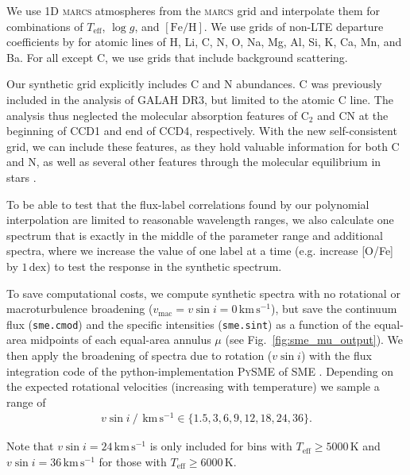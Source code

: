 \documentclass[
  journal=pasa,
  manuscript=research-paper, %
  year=2024,
  volume=37
]{cup-journal}
\newcommand{\Teff}{$T_\mathrm{eff}$\xspace}
\newcommand{\logg}{$\log g$\xspace}
\newcommand{\feh}{$\mathrm{[Fe/H]}$\xspace}
\newcommand{\vsini}{$v \sin i$\xspace}
\newcommand{\marcs}{\textsc{marcs}\xspace}
\newcommand{\dex}{\,\mathrm{dex}}	%
\newcommand{\kms}{\,\mathrm{km\,s^{-1}}}	%
\begin{document}
We use 1D \marcs atmospheres from the \marcs grid \citep[][version 2014]{Gustafsson2008} and interpolate them for combinations of \Teff, \logg, and \feh. We use grids of non-LTE departure coefficients by \citet{Amarsi2020} for atomic lines of H, Li, C, N, O, Na, Mg, Al, Si, K, Ca, Mn, and Ba. For all except C, we use grids that include background scattering.

Our synthetic grid explicitly includes C and N abundances. C was previously included in the analysis of GALAH DR3, but limited to the atomic C line. The analysis thus neglected the molecular absorption features of $\mathrm{C_2}$ and CN at the beginning of CCD1 and end of CCD4, respectively. With the new self-consistent grid, we can include these features, as they hold valuable information for both C and N, as well as several other features through the molecular equilibrium in stars \citep[see e.g.][]{Ting2018}.

To be able to test that the flux-label correlations found by our polynomial interpolation are limited to reasonable wavelength ranges, we also calculate one spectrum that is exactly in the middle of the parameter range and additional spectra, where we increase the value of one label at a time (e.g. increase [O/Fe] by $1\dex$) to test the response in the synthetic spectrum.

To save computational costs, we compute synthetic spectra with no rotational or macroturbulence broadening ($v_\text{mac} = v\sin i = 0\kms$), but save the continuum flux (\texttt{sme.cmod}) and the specific intensities (\texttt{sme.sint}) as a function of the equal-area midpoints of each equal-area annulus $\mu$ (see Fig.~\ref{fig:sme_mu_output}). We then apply the broadening of spectra due to rotation (\vsini) with the flux integration code of the python-implementation \textsc{PySME} \citep{Wehrhahn2021} of \textsc{SME} \citep{Piskunov2017}. Depending on the expected rotational velocities (increasing with temperature) we sample a range of
\begin{align} \label{eq:vsini}
    v \sin i~/~\kms \in \{ 1.5, 3, 6, 9, 12, 18, 24, 36\}.
\end{align}

Note that $v \sin i = 24 \kms$ is only included for bins with \Teff$\geq 5000\,\mathrm{K}$ and $v \sin i = 36 \kms$ for those with \Teff$\geq 6000\,\mathrm{K}$.

\end{document}
